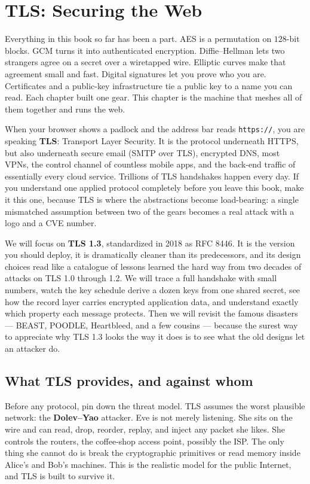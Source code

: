 \chapter{TLS: Securing the Web}

Everything in this book so far has been a part. AES is a permutation on $128$-bit
blocks. GCM turns it into authenticated encryption. Diffie--Hellman lets two
strangers agree on a secret over a wiretapped wire. Elliptic curves make that
agreement small and fast. Digital signatures let you prove who you are.
Certificates and a public-key infrastructure tie a public key to a name you can
read. Each chapter built one gear. This chapter is the machine that meshes all of
them together and runs the web.

When your browser shows a padlock and the address bar reads
\texttt{https://}, you are speaking \textbf{TLS}: Transport Layer Security. It is
the protocol underneath HTTPS, but also underneath secure email (SMTP over TLS),
encrypted DNS, most VPNs, the control channel of countless mobile apps, and the
back-end traffic of essentially every cloud service. Trillions of TLS handshakes
happen every day. If you understand one applied protocol completely before you
leave this book, make it this one, because TLS is where the abstractions become
load-bearing: a single mismatched assumption between two of the gears becomes a
real attack with a logo and a CVE number.

We will focus on \textbf{TLS 1.3}, standardized in 2018 as RFC 8446. It is the
version you should deploy, it is dramatically cleaner than its predecessors, and
its design choices read like a catalogue of lessons learned the hard way from two
decades of attacks on TLS 1.0 through 1.2. We will trace a full handshake with
small numbers, watch the key schedule derive a dozen keys from one shared secret,
see how the record layer carries encrypted application data, and understand
exactly which property each message protects. Then we will revisit the famous
disasters --- BEAST, POODLE, Heartbleed, and a few cousins --- because the surest
way to appreciate why TLS 1.3 looks the way it does is to see what the old designs
let an attacker do.

\chapterline

\section{What TLS provides, and against whom}

Before any protocol, pin down the threat model. TLS assumes the worst plausible
network: the \textbf{Dolev--Yao} attacker. Eve is not merely listening. She sits
on the wire and can read, drop, reorder, replay, and inject any packet she likes.
She controls the routers, the coffee-shop access point, possibly the ISP. The
only thing she cannot do is break the cryptographic primitives or read memory
inside Alice's and Bob's machines. This is the realistic model for the public
Internet, and TLS is built to survive it.

